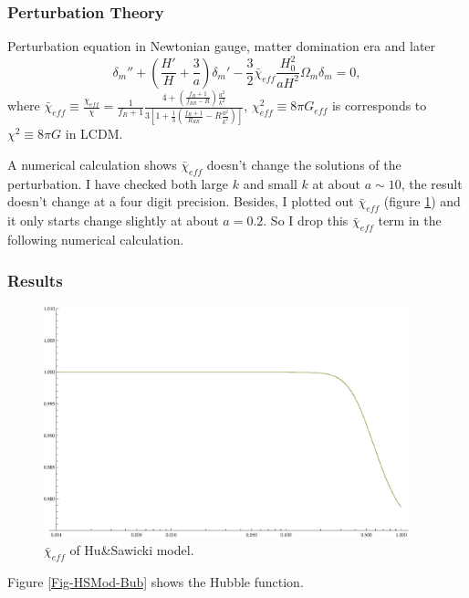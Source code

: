 \documentclass[12pt,a4paper]{article}
\begin{document}
\subsubsection{Perturbation Theory}

Perturbation equation in Newtonian gauge, matter domination era and later
\begin{equation}
\delta_m'' + \left(\frac{H'}{H}+\frac{3}{a}\right)\delta_m'-\frac32 \bar \chi_{eff} \frac{H_0^2}{aH^2}\Omega_m\delta_m=0 \label{Eq-HSModPer},
\end{equation}
where $\bar \chi_{eff}\equiv\frac{\chi_{eff}}{\chi}=\frac{1}{f_R+1}\frac{4+(\frac{f_R+1}{f_{RR}-R})\frac{a^2}{k^2}}{3[1+\frac13(\frac{f_R+1}{R_{RR}}-R\frac{a^2}{k^2})]}$, $\chi_{eff}^2\equiv 8\pi G_{eff}$ is corresponds to $\chi^2\equiv8\pi G$  in LCDM.

A numerical calculation shows $\bar\chi_{eff}$ doesn't change the solutions of the perturbation. I have checked both large $k$ and small $k$ at about $a\sim 10$, the result doesn't change at a four digit precision.
Besides, I plotted out $\bar\chi_{eff}$ (figure \ref{Fig-HSMod-chi}) and it only starts change slightly at about $a=0.2$. So I drop this $\bar\chi_{eff}$ term in the following numerical calculation.



\subsubsection{Results}

\begin{figure}[!htpb]
\centering
\includegraphics[width=300pt]{HSMod-chi.eps}
\caption{$\bar\chi_{eff}$ of Hu\&Sawicki model.}\label{Fig-HSMod-chi}
\end{figure}



Figure \ref{Fig-HSMod-Bub} shows the Hubble function.
\end{document}
